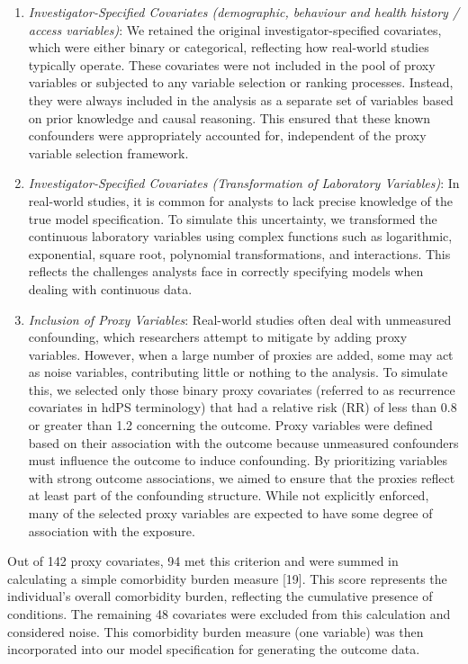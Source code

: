 \documentclass[10pt,letterpaper]{article}
\begin{document}
\begin{enumerate}
\def\labelenumi{\arabic{enumi}.}
\item
  \emph{Investigator-Specified Covariates (demographic, behaviour and
  health history / access variables)}: We retained the original
  investigator-specified covariates, which were either binary or
  categorical, reflecting how real-world studies typically operate.
  These covariates were not included in the pool of proxy variables or
  subjected to any variable selection or ranking processes. Instead,
  they were always included in the analysis as a separate set of
  variables based on prior knowledge and causal reasoning. This ensured
  that these known confounders were appropriately accounted for,
  independent of the proxy variable selection framework.
\item
  \emph{Investigator-Specified Covariates (Transformation of Laboratory
  Variables)}: In real-world studies, it is common for analysts to lack
  precise knowledge of the true model specification. To simulate this
  uncertainty, we transformed the continuous laboratory variables using
  complex functions such as logarithmic, exponential, square root,
  polynomial transformations, and interactions. This reflects the
  challenges analysts face in correctly specifying models when dealing
  with continuous data.
\item
  \emph{Inclusion of Proxy Variables}: Real-world studies often deal
  with unmeasured confounding, which researchers attempt to mitigate by
  adding proxy variables. However, when a large number of proxies are
  added, some may act as noise variables, contributing little or nothing
  to the analysis. To simulate this, we selected only those binary proxy
  covariates (referred to as recurrence covariates in hdPS terminology)
  that had a relative risk (RR) of less than 0.8 or greater than 1.2
  concerning the outcome. Proxy variables were defined based on their
  association with the outcome because unmeasured confounders must
  influence the outcome to induce confounding. By prioritizing variables
  with strong outcome associations, we aimed to ensure that the proxies
  reflect at least part of the confounding structure. While not
  explicitly enforced, many of the selected proxy variables are expected
  to have some degree of association with the exposure.
\end{enumerate}

Out of 142 proxy covariates, 94 met this criterion and were summed in
calculating a simple comorbidity burden measure {[}19{]}. This score
represents the individual's overall comorbidity burden, reflecting the
cumulative presence of conditions. The remaining 48 covariates were
excluded from this calculation and considered noise. This comorbidity
burden measure (one variable) was then incorporated into our model
specification for generating the outcome data.
\end{document}
